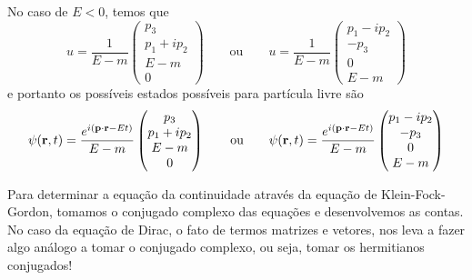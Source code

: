     No caso de $E < 0$, temos que
        \begin{equation*}
            u = \dfrac{1}{E-m}\begin{pmatrix}
                p_{3} \\
                p_{1} + ip_{2} \\
                E-m \\
                0
            \end{pmatrix} \qquad \text{ou} \qquad 
            u = \dfrac{1}{E-m}\begin{pmatrix}
                p_{1} - ip_{2} \\
                -p_{3} \\
                0 \\
                E - m
            \end{pmatrix}
        \end{equation*}
    e portanto os possíveis estados possíveis para partícula livre são
        \begin{equation*}
            \psi(\vb{r},t) = \dfrac{e^{i(\vb{p}\cdot\vb{r} - Et)}}{E-m}\begin{pmatrix}
                p_{3} \\
                p_{1} + ip_{2} \\
                E-m \\
                0
            \end{pmatrix} \qquad \text{ou} \qquad 
            \psi(\vb{r},t) = \dfrac{e^{i(\vb{p}\cdot\vb{r} - Et)}}{E-m}\begin{pmatrix}
                p_{1} - ip_{2} \\
                -p_{3} \\
                0 \\
                E - m
            \end{pmatrix}
        \end{equation*}

    Para determinar a equação da continuidade através da equação de Klein-Fock-Gordon, tomamos o conjugado complexo das equações e desenvolvemos as contas. No caso da equação de Dirac, o fato de termos matrizes e vetores, nos leva a fazer algo análogo a tomar o conjugado complexo, ou seja, tomar os hermitianos conjugados!

